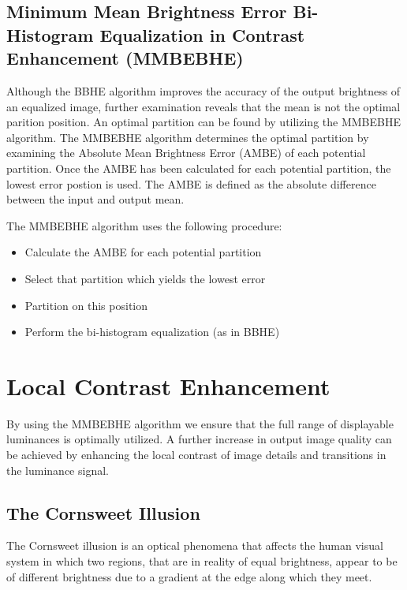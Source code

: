 \documentclass[twocolumn]{article}
\begin{document}
\subsection{Minimum Mean Brightness Error Bi-Histogram Equalization in Contrast Enhancement (MMBEBHE)}

Although the BBHE algorithm improves the accuracy of the output brightness of an equalized image, further examination reveals that the mean is not the optimal parition position. An optimal partition can be found by utilizing the MMBEBHE algorithm.\cite{wang05} The MMBEBHE algorithm determines the optimal partition by examining the Absolute Mean Brightness Error (AMBE) of each potential partition. Once the AMBE has been calculated for each potential partition, the lowest error postion is used.\cite{chen03} The AMBE is defined as the absolute difference between the input and output mean. 

The MMBEBHE algorithm uses the following procedure:

\begin{itemize}
\item Calculate the AMBE for each potential partition
\item Select that partition which yields the lowest error
\item Partition on this position
\item Perform the bi-histogram equalization (as in BBHE)
\end{itemize}

\section{Local Contrast Enhancement}

By using the MMBEBHE algorithm we ensure that the full range of displayable luminances is optimally utilized. A further increase in output image quality can be achieved by enhancing the local contrast of image details and transitions in the luminance signal.

\subsection{The Cornsweet Illusion}

The Cornsweet illusion is an optical phenomena that affects the human visual system in which two regions, that are in reality of equal brightness, appear to be of different brightness due to a gradient at the edge along which they meet.\cite{purves99}
\end{document}
